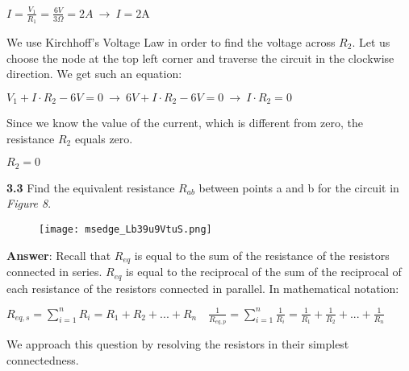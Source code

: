 \documentclass{article}
\begin{document}
{{\Large $\displaystyle I = \frac{V_{1}}{R_{1}} = \frac{6V}{3\Omega} = 2A \ \rightarrow \ \boxed{I = 2\text{A}} $}

{\vspace{4mm}}

{\Large We use Kirchhoff's Voltage Law in order to find the voltage across $R_{2}$. Let us choose the node at the top left corner and traverse the circuit in the clockwise direction. We get such an equation:}

{\vspace{4mm}}

{\Large $V_{1} + I\cdot R_{2} - 6V = 0 \ \rightarrow \ 6V + I\cdot R_{2} - 6V = 0 \ \rightarrow \ I\cdot R_{2} = 0$}

{\vspace{4mm}}

{\Large Since we know the value of the current, which is different from zero, the resistance $R_{2}$ equals zero.}

{\vspace{4mm}}

{\Large $\boxed{R_{2} = 0}$}

{\vspace{8mm}}

\newpage

{\Large \textbf{3.3} Find the equivalent resistance $R_{ab}$ between points a and b for the circuit in \textit{Figure 8}.}

\begin{figure}[H]
    \centering
    \texttt{[image: msedge\_Lb39u9VtuS.png]}
\end{figure}

{\Large \textbf{Answer}: Recall that $R_{eq}$ is equal to the sum of the resistance of the resistors connected in series. $R_{eq}$ is equal to the reciprocal of the sum of the reciprocal of each resistance of the resistors connected in parallel. In mathematical notation:}

{\vspace{4mm}}

\begin{center}
{\Large $\displaystyle R_{eq, s} = \sum_{i=1}^{n} R_{i} = R_1 + R_2 + {...} + R_n \quad  \frac{1}{R_{eq, p}} = \sum_{i=1}^{n} \frac{1}{R_{i}} = \frac{1}{R_{1}} + \frac{1}{R_{2}} + {...} + \frac{1}{R_{n}} $}
\end{center}

{\vspace{4mm}}

{\Large We approach this question by resolving the resistors in their simplest connectedness.}

}
\end{document}
